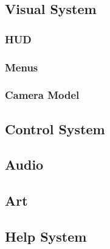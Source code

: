 \documentclass[12pt]{article}
\begin{document}
\subsection{Visual System}

\subsubsection{HUD}

\subsubsection{Menus}

\subsubsection{Camera Model}

\subsection{Control System}

\subsection{Audio}

\subsection{Art}

\subsection{Help System}
\end{document}
